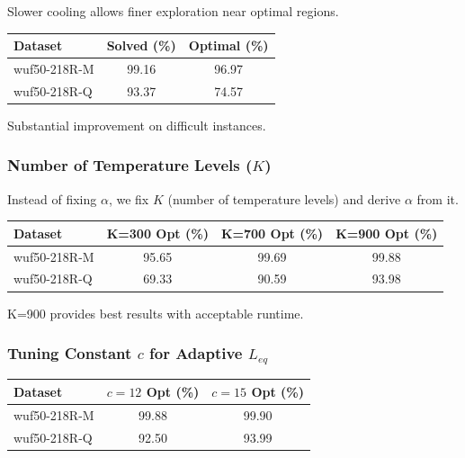 \documentclass[11pt]{article}
\begin{document}
    Slower cooling allows finer exploration near optimal regions.

    \begin{center}
        \begin{tabular}{lcc}
            \toprule
            Dataset      & Solved (\%) & Optimal (\%) \\
            \midrule
            wuf50-218R-M & 99.16       & 96.97        \\
            wuf50-218R-Q & 93.37       & 74.57        \\
            \bottomrule
        \end{tabular}
    \end{center}

    \noindent Substantial improvement on difficult instances.

    \subsubsection{Number of Temperature Levels (\texorpdfstring{$K$}{K})}

    Instead of fixing $\alpha$, we fix $K$ (number of temperature levels) and derive $\alpha$ from it.

    \begin{center}
        \begin{tabular}{lccc}
            \toprule
            Dataset      & K=300 Opt (\%) & K=700 Opt (\%) & K=900 Opt (\%) \\
            \midrule
            wuf50-218R-M & 95.65          & 99.69          & 99.88          \\
            wuf50-218R-Q & 69.33          & 90.59          & 93.98          \\
            \bottomrule
        \end{tabular}
    \end{center}

    \noindent K=900 provides best results with acceptable runtime.

    \subsubsection{Tuning Constant \texorpdfstring{$c$}{c} for Adaptive \texorpdfstring{$L_{eq}$}{Leq}}

    \begin{center}
        \begin{tabular}{lcc}
            \toprule
            Dataset      & $c=12$ Opt (\%) & $c=15$ Opt (\%) \\
            \midrule
            wuf50-218R-M & 99.88           & 99.90           \\
            wuf50-218R-Q & 92.50           & 93.99           \\
            \bottomrule
        \end{tabular}
    \end{center}
\end{document}
